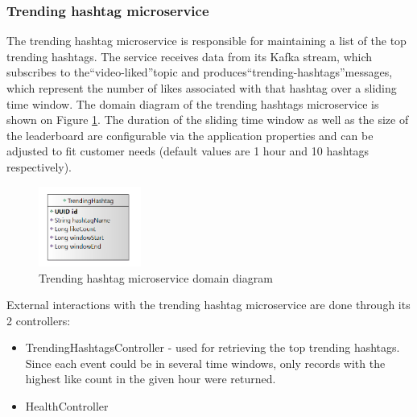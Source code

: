 \documentclass[parskip=full]{article}
\begin{document}
    \subsubsection{Trending hashtag microservice}
    The trending hashtag microservice is responsible for maintaining a list of the top trending hashtags.
    The service receives data from its Kafka stream, which subscribes to the``video-liked''topic and produces``trending-hashtags''messages, which represent the number of likes associated with that hashtag over a sliding time window.
    The domain diagram of the trending hashtags microservice is shown on Figure \ref{fig:thmDomain}.
    The duration of the sliding time window as well as the size of the leaderboard are configurable via the application properties and can be adjusted to fit customer needs (default values are 1 hour and 10 hashtags respectively).

    \begin{figure}
        \includegraphics[width=0.3\textwidth]{thm-domain-diagram}
        \caption{Trending hashtag microservice domain diagram}
        \label{fig:thmDomain}
    \end{figure}

    External interactions with the trending hashtag microservice are done through its 2 controllers:

    \begin{itemize}
        \item TrendingHashtagsController - used for retrieving the top trending hashtags.
        Since each event could be in several time windows, only records with the highest like count in the given hour were returned.
        \item HealthController
    \end{itemize}
\end{document}
